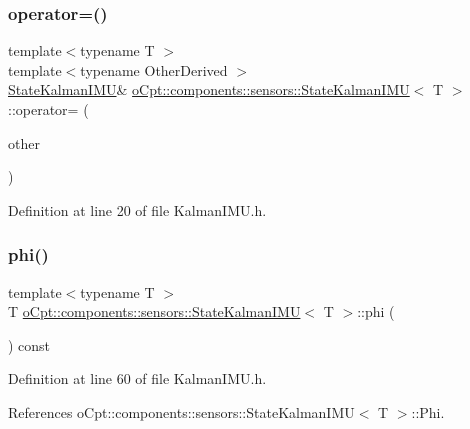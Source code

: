\subsubsection{\texorpdfstring{operator=()}{operator=()}}
{\footnotesize\ttfamily template$<$typename T $>$ \\
template$<$typename Other\+Derived $>$ \\
\hyperlink{classo_cpt_1_1components_1_1sensors_1_1_state_kalman_i_m_u}{State\+Kalman\+I\+MU}\& \hyperlink{classo_cpt_1_1components_1_1sensors_1_1_state_kalman_i_m_u}{o\+Cpt\+::components\+::sensors\+::\+State\+Kalman\+I\+MU}$<$ T $>$\+::operator= (\begin{DoxyParamCaption}\item[{const Eigen\+::\+Matrix\+Base$<$ Other\+Derived $>$ \&}]{other }\end{DoxyParamCaption})\hspace{0.3cm}{\ttfamily [inline]}}



Definition at line 20 of file Kalman\+I\+M\+U.\+h.

\hypertarget{classo_cpt_1_1components_1_1sensors_1_1_state_kalman_i_m_u_abdcc72fa4577d598c0dfa587e3fd5c50}{}\label{classo_cpt_1_1components_1_1sensors_1_1_state_kalman_i_m_u_abdcc72fa4577d598c0dfa587e3fd5c50} 
\subsubsection{\texorpdfstring{phi()}{phi()}\hspace{0.1cm}{\footnotesize\ttfamily [1/2]}}
{\footnotesize\ttfamily template$<$typename T $>$ \\
T \hyperlink{classo_cpt_1_1components_1_1sensors_1_1_state_kalman_i_m_u}{o\+Cpt\+::components\+::sensors\+::\+State\+Kalman\+I\+MU}$<$ T $>$\+::phi (\begin{DoxyParamCaption}{ }\end{DoxyParamCaption}) const\hspace{0.3cm}{\ttfamily [inline]}}



Definition at line 60 of file Kalman\+I\+M\+U.\+h.



References o\+Cpt\+::components\+::sensors\+::\+State\+Kalman\+I\+M\+U$<$ T $>$\+::\+Phi.



